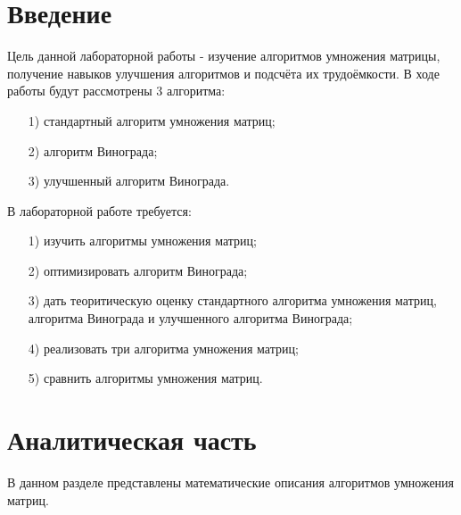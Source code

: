 \documentclass[14pt, a4paper]{extarticle}
\begin{document}
	\section*{Введение}
	Цель данной лабораторной работы - изучение алгоритмов умножения матрицы, получение навыков улучшения алгоритмов и подсчёта их трудоёмкости. В ходе работы будут рассмотрены 3 алгоритма:
	\begin{enumerate}
		\item[1)] стандартный алгоритм умножения матриц;
		\item[2)] алгоритм Винограда;
		\item[3)] улучшенный алгоритм Винограда.
	\end{enumerate}
	В лабораторной работе требуется:
	\begin{enumerate}
		\item[1)] изучить алгоритмы умножения матриц;
		\item[2)] оптимизировать алгоритм Винограда;
		\item[3)] дать теоритическую оценку стандартного алгоритма умножения матриц, алгоритма Винограда и улучшенного алгоритма Винограда;
		\item[4)] реализовать три алгоритма умножения матриц;
		\item[5)] сравнить алгоритмы умножения матриц.		
	\end{enumerate}
	
	
	\newpage
	\section{Аналитическая часть}
	В данном разделе представлены математические описания алгоритмов умножения матриц.
	
\end{document}
